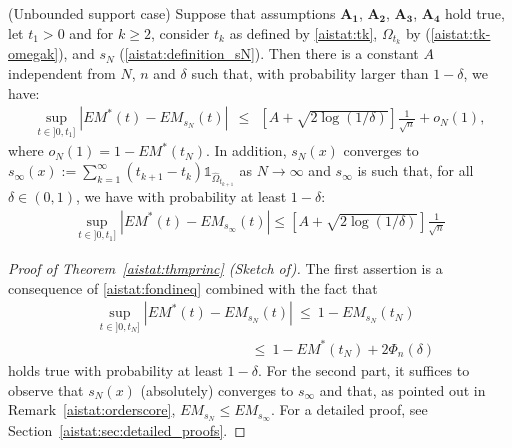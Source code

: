 \begin{theorem}({\sc Unbounded support case})
\label{aistat:thmprinc}
Suppose that assumptions $\mathbf{A_1}$, $\mathbf{A_2}$, $\mathbf{A_3}$, $\mathbf{A_4}$ hold true, let $t_1>0$ and for $k \ge 2$, consider $t_k$ as defined by \eqref{aistat:tk}, $\Omega_{t_k}$ by (\ref{aistat:tk-omegak}), and $s_N$ (\ref{aistat:definition_sN}). Then there is a constant $A$ independent from $N$, $n$ and $\delta$ such that, with probability larger than $1-\delta$, we have: 
\begin{align*}
\sup_{t \in ]0,t_1]}|EM^*(t)-EM_{s_N}(t)| ~~\le~~ \left[A+\sqrt{2\log(1/\delta)}\right]\frac{1}{\sqrt n} + o_N(1),
\end{align*}
where $o_N(1)=1-EM^*(t_N)$. In addition, $s_N(x)$ converges to $s_\infty(x):=\sum_{k=1}^{\infty} (t_{k+1}-t_k)\mathds{1}_{\hat \Omega_{t_{k+1}}}$ as $N \rightarrow \infty$ and $s_\infty$ is such that, for all $\delta \in (0,1)$, we have with probability at least $1-\delta$:
\begin{align*}
\sup_{t \in ]0,t_1]}|EM^*(t)-EM_{s_\infty}(t)| \le \left[A+\sqrt{2\log(1/\delta)}\right]\frac{1}{\sqrt n}
\end{align*}
\end{theorem}

\begin{proof}[Proof of Theorem~\ref{aistat:thmprinc} (Sketch of)]
The first assertion is a consequence of \eqref{aistat:fondineq} combined with the fact that
\begin{align*}
&\sup_{t \in ]0,t_N]} |EM^*(t)-EM_{s_N}(t)| ~\leq~ 1-EM_{s_N}(t_N) \\ &~~~~~~~~~~~~~~~~~~~~~~~~~~~~~~~~~~~~~~~~~~~~~~~~~~\leq~ 1-EM^*(t_N)+2\Phi_n(\delta)
\end{align*} 
holds true with probability at least $1-\delta$.
\noindent For the second part, it suffices to observe that $s_N(x)$ (absolutely) converges to $s_{\infty}$ and that, as pointed out in Remark~\ref{aistat:orderscore}, $EM_{s_N} \le EM_{s_\infty}$. 
For a detailed proof, see Section~\ref{aistat:sec:detailed_proofs}.
\end{proof}




